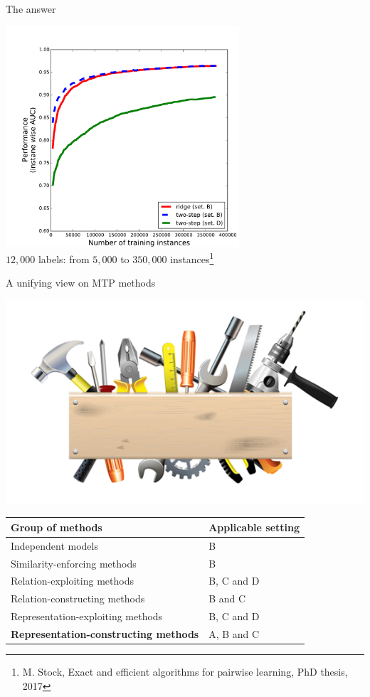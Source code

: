 \documentclass[]{beamer}
\renewcommand{\alert}[1]{\textbf{\color{putblue} #1}}
\begin{document}
\begin{frame}{The answer}  
 \center

\vspace{-0.5cm}
   \includegraphics[width=0.65\textwidth]{Figures/lc_wiki} \\
   $12,000$ labels: from $5,000$ to $350,000$ instances\footnote{M. Stock, Exact and efficient algorithms for pairwise learning, PhD thesis, 2017}
	\vspace{0.2cm}
\end{frame}


\begin{frame}{A unifying view on MTP methods}

\begin{center}
\includegraphics[scale=0.3]{pics/tools}

\begin{tabular}{ll}
\hline
Group of methods & Applicable setting \\
\hline
\hline
Independent models & B \\
Similarity-enforcing methods & B   \\ 
Relation-exploiting methods & B, C and D  \\
Relation-constructing methods & B and C \\
Representation-exploiting methods & B, C and D \\
\alert{Representation-constructing methods} & A, B and C \\
\hline  
\end{tabular}
\end{center}
\end{frame}
\end{document}
